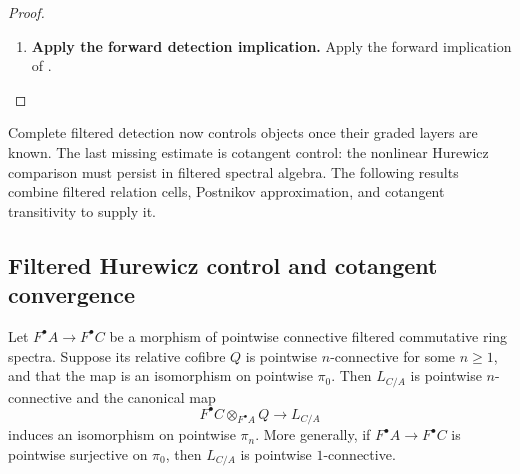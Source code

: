 \begin{proof}
\leavevmode
\begin{enumerate}[label=\textup{(\arabic*)}]
    \item \textbf{Apply the forward detection implication.}
    Apply the forward implication of
    .
\end{enumerate}
\end{proof}

Complete filtered detection now controls objects once their graded layers are known. The
last missing estimate is cotangent control: the nonlinear Hurewicz comparison must
persist in filtered spectral algebra. The following results combine filtered relation
cells, Postnikov approximation, and cotangent transitivity to supply it.

\subsection{Filtered Hurewicz control and cotangent convergence}

\begin{lemma}
\label{lem:filtered-relative-hurewicz-first-degree}
Let \(F^\bullet A\to F^\bullet C\) be a morphism of pointwise connective
filtered commutative ring spectra. Suppose its relative cofibre \(Q\) is
pointwise \(n\)-connective for some \(n\geq1\), and that the map is an
isomorphism on pointwise \(\pi_0\). Then \(L_{C/A}\) is pointwise
\(n\)-connective and the canonical map
\[
    F^\bullet C\otimes_{F^\bullet A}Q
    \longrightarrow
    L_{C/A}
\]
induces an isomorphism on pointwise \(\pi_n\). More generally, if
\(F^\bullet A\to F^\bullet C\) is pointwise surjective on \(\pi_0\), then
\(L_{C/A}\) is pointwise \(1\)-connective.
\end{lemma}

